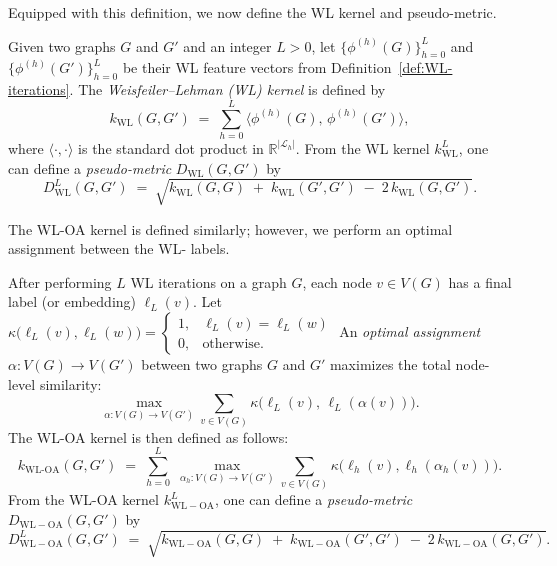 Equipped with this definition, we now define the WL kernel and pseudo-metric. 

\begin{definition}\label{def:WL-kernel}
  Given two graphs \(G\) and \(G'\) and an integer $L > 0$, let \(\{\phi^{(h)}(G)\}_{h=0}^L\) and \(\{\phi^{(h)}(G')\}_{h=0}^L\) be their WL feature vectors from Definition~\ref{def:WL-iterations}.
  The \emph{Weisfeiler--Lehman (WL) kernel} is defined by
  \[
    k_{\mathrm{WL}}(G, G') 
    \;=\; 
    \sum_{h=0}^L
      \bigl\langle \phi^{(h)}(G),\, \phi^{(h)}(G') \bigr\rangle,
  \]
  where \(\langle \cdot,\cdot\rangle\) is the standard dot product in \(\mathbb{R}^{|\mathcal{L}_h|}\). From the WL kernel \(k^L_{\mathrm{WL}}\), one can define a \emph{pseudo-metric} 
  \(D_{\mathrm{WL}}(G, G')\) by
  \[
    D^L_{\mathrm{WL}}(G, G')
    \;=\;
    \sqrt{
      k_{\mathrm{WL}}(G, G)
      \;+\;
      k_{\mathrm{WL}}(G', G')
      \;-\;
      2\,k_{\mathrm{WL}}(G, G')
    }.
  \]
\end{definition}

The WL-OA kernel is defined similarly; however, we perform an optimal assignment between the WL- labels. 

\begin{definition}[WL-OA Kernel]\label{def:WL-OA-kernel}
  After performing \(L\) WL iterations on a graph \(G\), each node \(v \in V(G)\) 
  has a final label (or embedding) \(\ell_L(v)\).  
  Let \(\kappa\bigl(\ell_L(v), \ell_L(w)\bigr) = \begin{cases}
      1, & \ell_L(v) = \ell_L(w) \\
      0, & \text{otherwise}.
  \end{cases}\) An \emph{optimal assignment} \(\alpha : V(G) \to V(G')\) between two graphs \(G\) 
  and \(G'\) maximizes the total node-level similarity:
  \[
    \max_{\alpha : V(G)\!\to\!V(G')}
    \sum_{v \in V(G)}
      \kappa\!\bigl(\ell_L(v),\, \ell_L(\alpha(v))\bigr).
  \] The WL-OA kernel is then defined as follows:
  \[
    k_{\mathrm{WL\text{-}OA}}(G, G')
    \;=\;
    \sum_{h=0}^L\;
      \max_{\alpha_h : V(G)\!\to\!V(G')} 
      \sum_{v \in V(G)} 
        \kappa\bigl(\ell_h(v), \ell_h(\alpha_h(v))\bigr).
  \]
  From the WL-OA kernel \(k^L_{\mathrm{WL-OA}}\), one can define a \emph{pseudo-metric} 
  \(D_{\mathrm{WL-OA}}(G, G')\) by
  \[
    D^L_{\mathrm{WL-OA}}(G, G')
    \;=\;
    \sqrt{
      k_{\mathrm{WL-OA}}(G, G)
      \;+\;
      k_{\mathrm{WL-OA}}(G', G')
      \;-\;
      2\,k_{\mathrm{WL-OA}}(G, G')
    }.
  \]
\end{definition}

